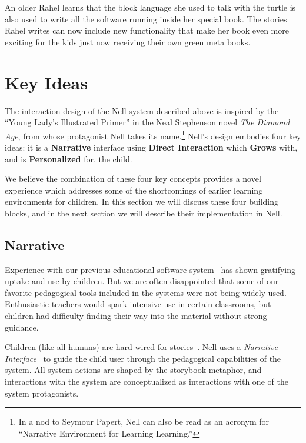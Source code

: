 \documentclass{acm_proc_article-sp}
\begin{document}
An older Rahel learns that the block language she used to talk with
the turtle is also used to write all the software running inside
her special book.  The stories Rahel writes can now include new
functionality that make her book even more exciting for the kids
just now receiving their own green meta books.

\section{Key Ideas}
The interaction design of the Nell system described above is inspired
by the ``Young Lady's Illustrated Primer'' in the Neal Stephenson
novel \textit{The Diamond Age}, from whose protagonist Nell takes its
name.\footnote{In a nod to Seymour Papert, Nell can also be read as an
acronym for ``Narrative Environment for Learning Learning.''}
Nell's design embodies four key ideas: it is a \textbf{Narrative}
interface using \textbf{Direct Interaction} which \textbf{Grows} with,
and is \textbf{Personalized} for, the child.

We believe the combination of these four key concepts provides a novel
experience which addresses some of the shortcomings of earlier
learning environments for children.  In this section we will discuss
these four building blocks, and in the next section we will describe their
implementation in Nell.


\subsection{Narrative}

Experience with our previous educational software
system~\cite{flores:uruguay,idb:peru} has shown gratifying uptake and
use by children.  But we are often disappointed that some of our
favorite pedagogical tools included in the systems were not being
widely used.  Enthusiastic teachers would spark intensive use in
certain classrooms, but children had difficulty finding their way into
the material without strong guidance.

Children (like all humans) are hard-wired for
stories~\cite{boyd:stories}.  Nell uses a
\textit{Narrative Interface}~\cite{bizzocchi:narrative,don:narrative,laurel:computers} 
to guide the child user through the pedagogical capabilities of the
system.  All system actions are shaped by the storybook metaphor, and
interactions with the system are conceptualized as interactions with
one of the system protagonists.
\end{document}
